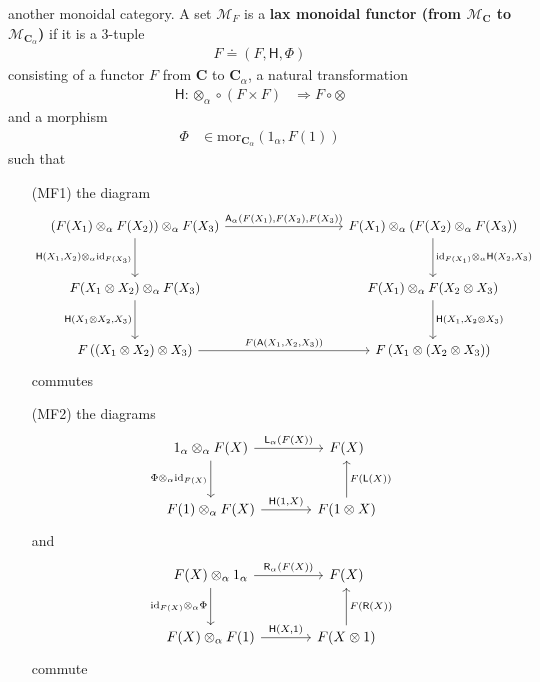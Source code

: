 another monoidal category. A set $\mathcal{M}_{F}$ is a \textbf{lax monoidal functor (from $\mathcal{M}_{\mathbf{C}}$ to $\mathcal{M}_{\mathbf{C}_{\alpha}}$)} if it is a $3$-tuple
\begin{align*}
  F
  \doteq
  \left(
    F,
    \mathsf{H},
    \Phi
  \right)
\end{align*}
consisting of a functor $F$ from $\mathbf{C}$ to $\mathbf{C}_{\alpha}$, a natural transformation
\begin{align*}
  \mathsf{H}
  \colon
  \otimes_{\alpha}
  \circ
  \left(
    F
    \times
    F
  \right)
  &\Rightarrow
  F
  \circ
  \otimes
\end{align*}
and a morphism
\begin{align*}
  \Phi
  &\in
  \mathrm{mor}_{\mathbf{C}_{\alpha}}(1_{\alpha},F(1))
\end{align*}
such that
\begin{enumerate}
\item[(MF1)]
the diagram
\begin{equation*}
\begin{tikzcd}[row sep=3em, column sep=9em]
  (F(X_{1}) \otimes_{\alpha} F(X_{2}))
  \otimes_{\alpha}
  F(X_{3})
  \arrow{r}{\mathsf{A}_{\alpha}(F(X_{1}),F(X_{2}),F(X_{3}))}
  \arrow[swap]{d}{\mathsf{H}(X_{1},X_{2})\otimes_{\alpha}\mathrm{id}_{F(X_{3})}}
  &
  F(X_{1})
  \otimes_{\alpha}
  (F(X_{2}) \otimes_{\alpha} F(X_{3}))
  \arrow{d}{\mathrm{id}_{F(X_{1})} \otimes_{\alpha} \mathsf{H}(X_{2},X_{3})}
  \\
  F(X_{1} \otimes X_{2})
  \otimes_{\alpha}
  F(X_{3})
  \arrow[swap]{d}{\mathsf{H}(X_{1} \otimes X_{2},X_{3})}
  &
  F(X_{1})
  \otimes_{\alpha}
  F(X_{2} \otimes X_{3})
  \arrow{d}{\mathsf{H}(X_{1},X_{2} \otimes X_{3})}
  \\
  F
  \left(
    (X_{1} \otimes X_{2})
    \otimes
    X_{3}
  \right)
  \arrow{r}{F(\mathsf{A}(X_{1},X_{2},X_{3}))}
  &
  F
  \left(
    X_{1}
    \otimes
    (X_{2} \otimes X_{3})
  \right)
\end{tikzcd}
\end{equation*}
commutes
\item[(MF2)]
the diagrams
\begin{equation*}
\begin{tikzcd}[sep=large]
  1_{\alpha}
  \otimes_{\alpha}
  F(X)
  \arrow{r}{\mathsf{L}_{\alpha}(F(X))}
  \arrow[swap]{d}{\Phi \otimes_{\alpha} \mathrm{id}_{F(X)}}
  &
  F(X)
  \\
  F(1)
  \otimes_{\alpha}
  F(X)
  \arrow{r}{\mathsf{H}(1,X)}
  &
  F(1 \otimes X)
  \arrow[swap]{u}{F(\mathsf{L}(X))}
\end{tikzcd}
\end{equation*}
and
\begin{equation*}
\begin{tikzcd}[sep=large]
  F(X)
  \otimes_{\alpha}
  1_{\alpha}
  \arrow{r}{\mathsf{R}_{\alpha}(F(X))}
  \arrow[swap]{d}{\mathrm{id}_{F(X)} \otimes_{\alpha} \Phi}
  &
  F(X)
  \\
  F(X)
  \otimes_{\alpha}
  F(1)
  \arrow{r}{\mathsf{H}(X,1)}
  &
  F(X \otimes 1)
  \arrow[swap]{u}{F(\mathsf{R}(X))}
\end{tikzcd}
\end{equation*}
commute
\end{enumerate}
